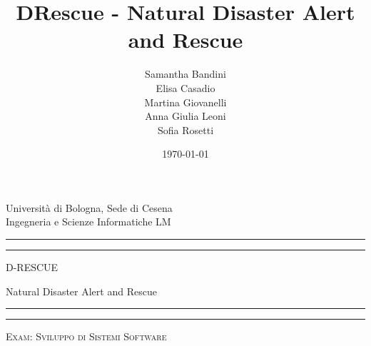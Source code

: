 \documentclass[a4paper,12pt]{report}
\title{DRescue - Natural Disaster Alert and Rescue}
\author{Samantha Bandini\\Elisa Casadio\\Martina Giovanelli\\Anna Giulia Leoni\\Sofia Rosetti}
\date{\today}
\begin{document}

\begin{titlepage} %

	\centering %
	
	
	\vspace*{\baselineskip} %
	
	{\LARGE Università di Bologna, Sede di Cesena \\ Ingegneria e Scienze Informatiche LM} %
	
	\vspace{4\baselineskip}	
	
	
	\rule{\textwidth}{1.6pt}\vspace*{-\baselineskip}\vspace*{2pt} %
	\rule{\textwidth}{0.4pt} %
	
	\vspace{0.90\baselineskip} %
	
	{\Huge  D-RESCUE}
	
	\vspace{0.40\baselineskip} 
	
	{\huge  Natural Disaster Alert and Rescue} %
	
	\vspace{0.30\baselineskip} %
	
	\rule{\textwidth}{0.4pt}\vspace*{-\baselineskip}\vspace{3.2pt} %
 	\rule{\textwidth}{1.6pt} %
	
	\vspace{3\baselineskip} %
	
	
	{\scshape \Large Exam: Sviluppo di Sistemi Software}
	

\end{titlepage}
\end{document}
